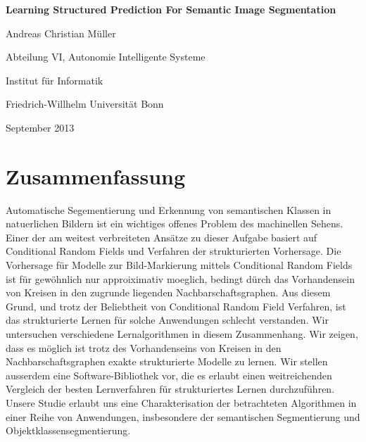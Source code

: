 \documentclass[12pt,toc=bibnumbered, a4paper,twoside,DIV=calc]{scrbook}
\begin{document}
\begin{spacing}{1}
\begin{titlepage}
\begin{center}
\vspace*{1in}
\textbf{{\LARGE Learning Structured Prediction For Semantic Image Segmentation}}
\par
\vspace{1.5in} {\large Andreas Christian M\"uller}
\par \vspace{0.5in}
Abteilung VI, Autonomie Intelligente Systeme \par
Institut f\"ur Informatik
\par \vspace{0.5in}
Friedrich-Willhelm Universit\"at Bonn \par
\vspace{0.5in} September 2013 \end{center}

\end{titlepage}


\tableofcontents
\end{spacing}
\chapter*{Zusammenfassung}
Automatische Segementierung und Erkennung von semantischen Klassen in
natuerlichen Bildern ist ein wichtiges offenes Problem des machinellen Sehens.
Einer der am weitest verbreiteten Ans\"atze zu dieser Aufgabe basiert auf
Conditional Random Fields und Verfahren der strukturierten Vorhersage. Die
Vorhersage f\"ur Modelle zur Bild-Markierung mittels Conditional Random Fields
ist f\"ur gew\"ohnlich nur approiximativ moeglich, bedingt d\"urch das
Vorhandensein von Kreisen in den zugrunde liegenden Nachbarschaftsgraphen.
Aus diesem Grund, und trotz der Beliebtheit von Conditional Random Field
Verfahren, ist das strukturierte Lernen f\"ur solche Anwendungen schlecht
verstanden.
%
Wir untersuchen verschiedene Lernalgorithmen in diesem
Zusammenhang. Wir zeigen, dass es m\"oglich ist trotz des Vorhandenseins von
Kreisen in den Nachbarschaftsgraphen exakte strukturierte Modelle zu lernen.
Wir stellen ausserdem eine Software-Bibliothek vor, die es erlaubt einen
weitreichenden Vergleich der besten Lernverfahren f\"ur strukturiertes Lernen
durchzuf\"uhren.
Unsere Studie erlaubt uns eine Charakterisation der betrachteten Algorithmen
in einer Reihe von Anwendungen, insbesondere der semantischen Segmentierung und
Objektklassensegmentierung.
\end{document}
